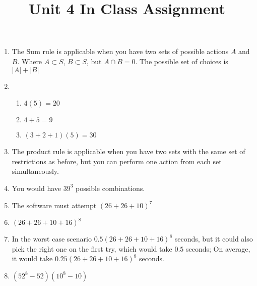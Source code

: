 \documentclass{article}
\title{Unit 4 In Class Assignment}
\begin{document}
\maketitle
\pagebreak

\begin{enumerate}
    \item The Sum rule is applicable when you have two sets of possible actions $A$ and $B$. Where $A \subset S$, $B \subset S$, but $A \cap B = 0$. The possible set of choices is $|A| + |B|$
    \item \begin{enumerate}
        \item $4(5) = 20$
	\item $4 + 5 = 9$ 
	\item $(3 + 2 + 1)(5) = 30$
    \end{enumerate}
    \item The product rule is applicable when you have two sets with the same set of restrictions as before, but you can perform one action from each set simultaneously.
    \item You would have $39^{3}$ possible combinations.
    \item The software must attempt $( 26 + 26 + 10 )^{7}$
    \item $(26 + 26 + 10 + 16)^{8}$
    \item In the worst case scenario $0.5(26 + 26 + 10 + 16)^{8}$ seconds, but it could also pick the right one on the first try, which would take $0.5$ seconds; On average, it would take $0.25(26 + 26 + 10 + 16)^{8}$ seconds.
    \item $(52^{8} - 52)(10^{8} - 10)$
\end{enumerate}
\end{document}
